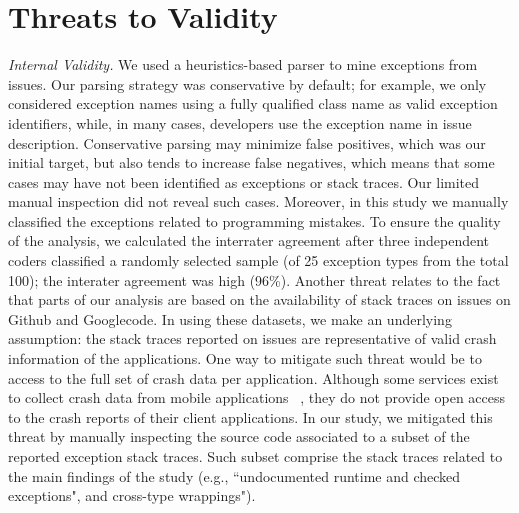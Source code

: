 \documentclass[conference]{IEEEtran}
\begin{document}
\section{Threats to Validity}
\label{sec:threats}

\noindent\emph{Internal Validity.} We used a heuristics-based parser to mine
exceptions from issues.  Our parsing strategy was conservative by default; for
example, we only considered exception names using a fully qualified class name
as valid exception identifiers, while, in many cases, developers use the
exception name in issue description. Conservative parsing may minimize false
positives, which was our initial target, but also tends to increase false
negatives, which means that some cases may have not been identified as
exceptions or stack traces. Our limited manual inspection did not reveal such
cases. Moreover, in this study we manually classified the exceptions 
related to programming mistakes. To ensure the quality of the analysis, 
we calculated the interrater agreement after three independent 
coders classified a randomly selected sample (of 25 exception 
types from the total 100); the interater agreement was high (96\%). 
Another threat relates to the fact that parts of our analysis 
are based on the availability of stack traces on issues on Github and Googlecode. 
In using these datasets, we make an underlying assumption: the stack traces reported on issues are 
representative of valid crash information of the applications. 
One way to mitigate such threat would be to access to the full 
set of crash data per application. Although some services exist 
to collect crash data from mobile applications ~\cite{BugSe14,BugSn14,Googl14,Acra14},
they do not provide open access to the crash reports of their client applications.
In our study, we mitigated this threat by manually inspecting
the source code associated to a subset of the reported exception stack traces.
Such subset comprise the stack traces related to the main findings 
of the study (e.g., ``undocumented runtime and checked exceptions",
and cross-type wrappings").
\end{document}
